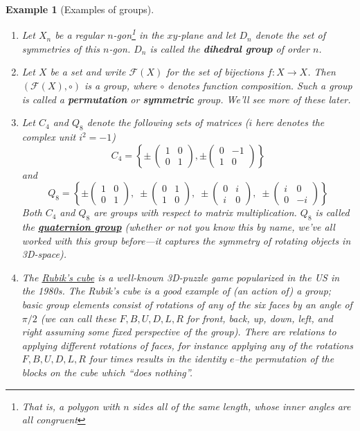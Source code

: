 \documentclass[12pt]{article}
\numberwithin{equation}{subsection}
\theoremstyle{note}
\newtheorem{example}[subsection]{Example}
\begin{document}
\begin{example}[Examples of groups]
\begin{enumerate}
\item Let $X_n$ be a regular $n$-gon\footnote{That is, a polygon with $n$ sides all of the same length, whose inner angles are all congruent} in the $xy$-plane and let $D_n$ denote the set of symmetries of this $n$-gon. $D_n$ is called the \textbf{dihedral group} of order $n$. 

\item Let $X$ be a set and write $\mathcal{F}(X)$ for the set of bijections $f\colon X\to X$. Then $(\mathcal{F}(X),\circ)$ is a group, where $\circ$ denotes function composition. Such a group is called a \textbf{permutation} or \textbf{symmetric} group. We'll see more of these later.
\item \label{quats} Let $C_4$ and $Q_8$ denote the following sets of matrices ($i$ here denotes the complex unit $i^2=-1$) \begin{equation} C_4=\left\{ \pm \, \begin{pmatrix} 1 & 0 \\ 0 & 1 \end{pmatrix}, \pm \begin{pmatrix} 0 & -1 \\ 1 & 0\end{pmatrix}\right\} \end{equation} and \begin{equation} \label{q-8} Q_8=\left\{ \pm \begin{pmatrix} 1 & 0 \\ 0 & 1 \end{pmatrix}, \; \pm \begin{pmatrix} 0 & 1 \\ 1 & 0 \end{pmatrix}, \; \pm \begin{pmatrix} 0 & i \\ i & 0\end{pmatrix},\; \pm \begin{pmatrix} i & 0 \\ 0 & -i \end{pmatrix}\right\}\end{equation}
Both $C_4$ and $Q_8$ are groups with respect to matrix multiplication. $Q_8$ is called the \href{https://en.wikipedia.org/wiki/Quaternion_group}{\textbf{quaternion group}} (whether or not you know this by name, we've all worked with this group before---it captures the symmetry of rotating objects in 3D-space).
\item The \href{https://en.wikipedia.org/wiki/Rubik's_Cube}{\textit{Rubik's cube}} is a well-known 3D-puzzle game popularized in the US in the 1980s. The Rubik's cube is a good example of (an action of) a group; basic group elements consist of rotations of any of the six faces by an angle of $\pi/2$ (we can call these $F,B,U,D,L,R$ for front, back, up, down, left, and right assuming some fixed perspective of the group). There are relations to applying different rotations of faces, for instance applying any of the rotations $F,B,U,D,L,R$ four times results in the identity $e$--the permutation of the blocks on the cube which ``does nothing''.
\end{enumerate}
\end{example}
\end{document}
